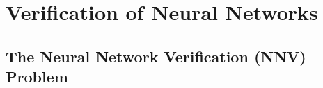 \documentclass[oneside,11pt,dvipsnames]{book}
\numberwithin{equation}{section}
\theoremstyle{definition}
\theoremstyle{remark}
\newcommand{\tvn}[1]{\iftoggle{usecomment}{{\color{red}{[TVN]: #1}}}{}}
\newcommand{\hd}[1]{\iftoggle{usecomment}{{\color{blue}{[HD]: #1}}}{}}
\begin{document}










\chapter{Verification of Neural Networks}\label{sec:verification}


\section{The Neural Network Verification (NNV) Problem}\label{sec:nnv-problem}
\end{document}
